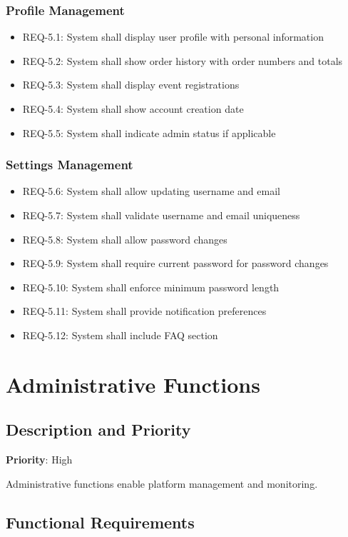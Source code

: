 \documentclass{scrreprt}
\begin{document}
\subsubsection{Profile Management}
\begin{itemize}
\item REQ-5.1: System shall display user profile with personal information
\item REQ-5.2: System shall show order history with order numbers and totals
\item REQ-5.3: System shall display event registrations
\item REQ-5.4: System shall show account creation date
\item REQ-5.5: System shall indicate admin status if applicable
\end{itemize}

\subsubsection{Settings Management}
\begin{itemize}
\item REQ-5.6: System shall allow updating username and email
\item REQ-5.7: System shall validate username and email uniqueness
\item REQ-5.8: System shall allow password changes
\item REQ-5.9: System shall require current password for password changes
\item REQ-5.10: System shall enforce minimum password length
\item REQ-5.11: System shall provide notification preferences
\item REQ-5.12: System shall include FAQ section
\end{itemize}

\section{Administrative Functions}

\subsection{Description and Priority}
\textbf{Priority}: High

Administrative functions enable platform management and monitoring.

\subsection{Functional Requirements}
\end{document}
